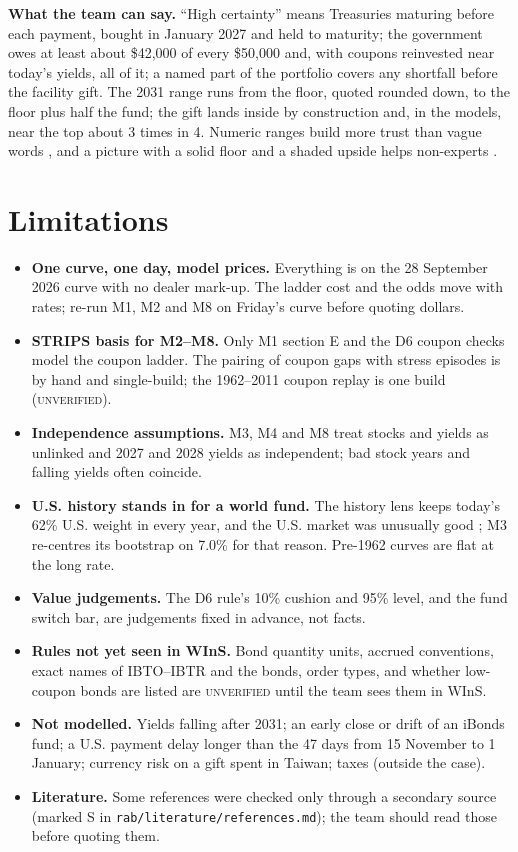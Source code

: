 \documentclass[11pt,a4paper]{article}
\newcommand{\UNV}{\textsc{unverified}}
\begin{document}
\textbf{What the team can say.} ``High certainty'' means Treasuries maturing before each payment, bought in January
2027 and held to maturity; the government owes at least about \$42,000 of every \$50,000 and, with coupons reinvested
near today's yields, all of it; a named part of the portfolio covers any shortfall before the facility gift. The 2031
range runs from the floor, quoted rounded down, to the floor plus half the fund; the gift lands inside by construction
and, in the models, near the top about 3 times in 4. Numeric ranges build more trust than vague words
\citep{vanderbles2020trust}, and a picture with a solid floor and a shaded upside helps non-experts
\citep{spiegelhalter2011visualizing}.

\section{Limitations}\label{sec:limits}

\begin{itemize}
  \item \textbf{One curve, one day, model prices.} Everything is on the 28 September 2026 curve with no dealer mark-up.
  The ladder cost and the odds move with rates; re-run M1, M2 and M8 on Friday's curve before quoting dollars.
  \item \textbf{STRIPS basis for M2--M8.} Only M1 section E and the D6 coupon checks model the coupon ladder. The
  pairing of coupon gaps with stress episodes is by hand and single-build; the 1962--2011 coupon replay is one build
  (\UNV).
  \item \textbf{Independence assumptions.} M3, M4 and M8 treat stocks and yields as unlinked and 2027 and 2028 yields as
  independent; bad stock years and falling yields often coincide.
  \item \textbf{U.S. history stands in for a world fund.} The history lens keeps today's 62\% U.S. weight in every year,
  and the U.S. market was unusually good \citep{anarkulova2022stocks}; M3 re-centres its bootstrap on 7.0\% for that
  reason. Pre-1962 curves are flat at the long rate.
  \item \textbf{Value judgements.} The D6 rule's 10\% cushion and 95\% level, and the fund switch bar, are judgements
  fixed in advance, not facts.
  \item \textbf{Rules not yet seen in WInS.} Bond quantity units, accrued conventions, exact names of IBTO--IBTR and the
  bonds, order types, and whether low-coupon bonds are listed are \UNV{} until the team sees them in WInS.
  \item \textbf{Not modelled.} Yields falling after 2031; an early close or drift of an iBonds fund; a U.S. payment
  delay longer than the 47 days from 15 November to 1 January; currency risk on a gift spent in Taiwan; taxes (outside
  the case).
  \item \textbf{Literature.} Some references were checked only through a secondary source (marked S in
  \texttt{rab/literature/references.md}); the team should read those before quoting them.
\end{itemize}
\end{document}
